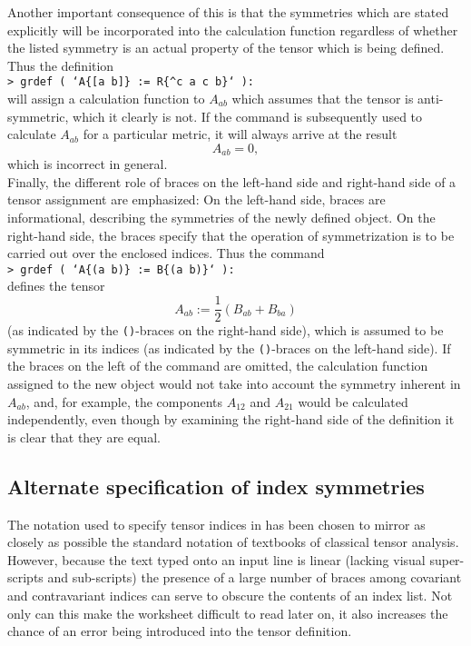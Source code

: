 \documentclass{article}
\begin{document}
Another important consequence of this is that the symmetries which are
stated explicitly will be incorporated into the calculation function
regardless of whether the listed symmetry is an actual property of
the tensor which is being defined. Thus the definition\\

\noindent\texttt{> grdef ( `A\{[a b]\} := R\{\^{}c a c b\}` ):}\\

\noindent will assign a calculation function to $A_{ab}$ which assumes
that the tensor is anti-symmetric, which it clearly is not. If the
 command is subsequently used to calculate $A_{ab}$ for
a particular metric, it will always arrive at the result
\[
  A_{ab} = 0,
\]
which is incorrect in general.\\

Finally, the different role of braces on the left-hand side and
right-hand side of a tensor assignment are emphasized: On the
left-hand side, braces are informational, describing the symmetries
of the newly defined object. On the right-hand side, the
braces specify that the operation of symmetrization is to be carried
out over the enclosed indices. Thus the command\\

\noindent\texttt{> grdef ( `A\{(a b)\} := B\{(a b)\}` ):}\\

\noindent defines the tensor
\[
  A_{ab} := \frac{1}{2} \left( B_{ab} + B_{ba} \right)
\]
(as indicated by the \texttt{()}-braces on the right-hand side), which
is assumed to be symmetric in its indices (as indicated by the
\texttt{()}-braces on the left-hand side). If the braces on the left
of the  command are omitted, the calculation function
assigned to the new object would not take into account the symmetry
inherent in $A_{ab}$, and, for example, the components $A_{12}$ and
$A_{21}$ would be calculated independently, even though by examining the
right-hand side of the definition it is clear that they are equal.
%
\subsection*{Alternate specification of index symmetries}\label{sec:symList}
%
The notation used to specify tensor indices in  has been
chosen to mirror as closely as possible the standard notation of
textbooks of classical tensor analysis. However, because the text
typed onto an input line is linear (lacking visual super-scripts and
sub-scripts) the presence of a large number of braces among covariant
and contravariant indices can serve to obscure the contents of an
index list. Not only can this make the worksheet difficult to read
later on, it also increases the chance of an error being introduced
into the tensor definition.
\end{document}
